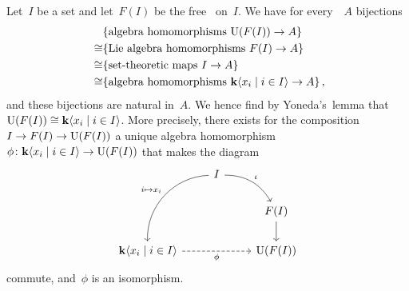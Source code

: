 \begin{example}
  \label{uea of free lie algebra}
  Let~$I$ be a set and let~$F(I)$ be the free~{\liealgebra{$\kf$}} on~$I$.
  We have for every~{\algebra{$\kf$}}~$A$ bijections
  \begin{align*}
    {}&
    \{ \text{algebra homomorphisms~$\Univ(F(I)) \to A$} \}
    \\
    \cong&
    \{ \text{Lie~algebra homomorphisms~$F(I) \to A$} \}
    \\
    \cong&
    \{ \text{set-theoretic maps~$I \to A$} \}
    \\\
    \cong&
    \{ \text{algebra homomorphisms~$\kf\gen{x_i \suchthat i \in I} \to A$} \} \,,
  \end{align*}
  and these bijections are natural in~$A$.
  We hence find by Yoneda’s~lemma that~$\Univ(F(I)) \cong \kf\gen{x_i \suchthat i \in I}$.
  More precisely, there exists for the composition~$I \to F(I) \to \operatorname{U}(F(I))$ a unique algebra homomorphism~$\phi \colon \kf\gen{x_i \suchthat i \in I} \to \Univ(F(I))$ that makes the diagram
  \[
    \begin{tikzcd}
        {}
      & I
        \arrow[bend right, out = -45, in=225]{ddl}[above left]{i \mapsto x_i}
        \arrow[bend left]{dr}[above right]{\iota}
      & {}
      \\
        {}
      & {}
      & F(I)
        \arrow{d}
      \\
        \kf\gen{x_i \suchthat i \in I}
        \arrow[dashed]{rr}[below]{\phi}
      & {}
      & \Univ(F(I))
    \end{tikzcd}
  \]
  commute, and~$\phi$ is an isomorphism.
\end{example}




